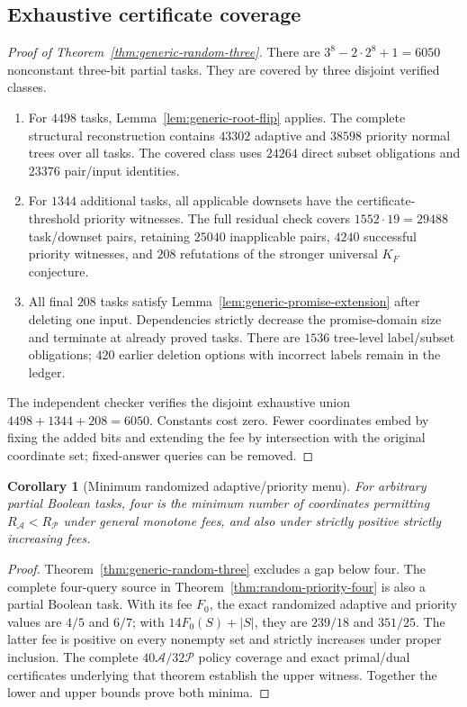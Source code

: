 \documentclass[pdflatex,sn-mathphys-num]{sn-jnl}
\theoremstyle{thmstyleone}
\newtheorem{corollary}[theorem]{Corollary}
\theoremstyle{thmstylethree}
\theoremstyle{thmstyletwo}
\begin{document}
\subsection{Exhaustive certificate coverage}
\begin{proof}[Proof of Theorem~\ref{thm:generic-random-three}]
There are $3^8-2\cdot2^8+1=6050$ nonconstant three-bit partial tasks.
They are covered by three disjoint verified classes.
\begin{enumerate}
\item For $4498$ tasks, Lemma~\ref{lem:generic-root-flip} applies.
The complete structural reconstruction contains $43302$ adaptive and
$38598$ priority normal trees over all tasks. The covered class uses
$24264$ direct subset obligations and $23376$ pair/input identities.
\item For $1344$ additional tasks, all applicable downsets have the
certificate-threshold priority witnesses. The full residual check covers
$1552\cdot19=29488$ task/downset pairs, retaining $25040$ inapplicable
pairs, $4240$ successful priority witnesses, and $208$ refutations of the
stronger universal $K_F$ conjecture.
\item All final $208$ tasks satisfy
Lemma~\ref{lem:generic-promise-extension} after deleting one input.
Dependencies strictly decrease the promise-domain size and terminate at
already proved tasks. There are $1536$ tree-level label/subset obligations;
$420$ earlier deletion options with incorrect labels remain in the ledger.
\end{enumerate}
The independent checker verifies the disjoint exhaustive union
$4498+1344+208=6050$. Constants cost zero. Fewer coordinates embed by fixing
the added bits and extending the fee by intersection with the original
coordinate set; fixed-answer queries can be removed.
\end{proof}

\begin{corollary}[Minimum randomized adaptive/priority menu]
\label{cor:generic-random-minimum-four}
For arbitrary partial Boolean tasks, four is the minimum number of
coordinates permitting $R_{\mathcal A}<R_{\mathcal P}$ under general
monotone fees, and also under strictly positive strictly increasing fees.
\end{corollary}
\begin{proof}
Theorem~\ref{thm:generic-random-three} excludes a gap below four. The complete four-query source in Theorem~\ref{thm:random-priority-four} is also a partial Boolean task. With its fee $F_0$, the exact randomized adaptive and priority values are $4/5$ and $6/7$; with $14F_0(S)+|S|$, they are $239/18$ and $351/25$. The latter fee is positive on every nonempty set and strictly increases under proper inclusion. The complete $40\mathcal A/32\mathcal P$ policy coverage and exact primal/dual certificates underlying that theorem establish the upper witness. Together the lower and upper bounds prove both minima.
\end{proof}
\end{document}
